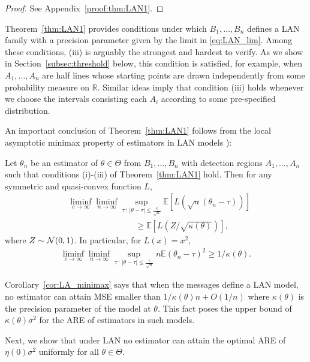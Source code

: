 \begin{proof}
See Appendix~\ref{proof:thm:LAN1}. 
\end{proof}

Theorem~\ref{thm:LAN1} provides conditions under which $B_1,\ldots,B_n$ defines a LAN family with a precision parameter given by the limit in \eqref{eq:LAN_lim}. 
%
Among these conditions, (iii) is arguably the strongest and hardest to verify. As we show in Section~\ref{subsec:threshold} below, this condition is satisfied, for example, when $A_1, \ldots,A_n$ are half lines whose starting points are drawn independently from some probability measure on $\mathbb R$. Similar ideas imply that condition (iii) holds whenever we choose the intervals consisting each $A_i$ according to some pre-specified distribution. \par
%
An important conclusion of  Theorem~\ref{thm:LAN1} follows from the local asymptotic minimax property of estimators in LAN models \cite{van2000asymptotic}):
\begin{cor} \label{cor:LA_minimax}
Let ${\theta}_n$ be an estimator of $\theta \in \Theta$ from $B_1,\ldots,B_n$ with detection regions $A_1,\ldots,A_n$ such that conditions (i)-(iii) of Theorem~\ref{thm:LAN1} hold. Then for any symmetric and quasi-convex function $L$, 
\begin{align*}
& \liminf_{c \to \infty} \liminf_{n \to \infty} \sup_{\tau\,:\,|\theta-\tau| \leq \frac{c}{\sqrt{n} }}  \mathbb E \left[ L\left( \sqrt{n}({\theta}_{n} - \tau) \right) \right]
\\
& \qquad \qquad \qquad \qquad \geq \mathbb E \left[ L (Z/\sqrt{\kappa(\theta)}) \right],
\end{align*}
where $Z \sim \mathcal{N}(0,1)$. In particular, for $L(x) = x^2$,
\begin{align*}
\liminf_{c \to \infty} \liminf_{n \to \infty} \sup_{\tau\,:\,|\theta-\tau| \leq \frac{c}{\sqrt{n} }}  n \mathbb E  \left( {\theta}_{n} - \tau \right)^2 \geq 1/\kappa(\theta).
\end{align*}
\end{cor}
%
Corollary~\ref{cor:LA_minimax} says that when the messages define a LAN model, no estimator can attain MSE smaller than $1/\kappa(\theta)n + O(1/n)$ where $\kappa(\theta)$ is the precision parameter of the model at $\theta$. This fact poses the upper bound of $\kappa(\theta)\sigma^2$ for the ARE of estimators in such models. \par

Next, we show that under LAN no estimator can attain the optimal ARE of $\eta(0)\sigma^2$ uniformly for all $\theta \in \Theta$.

